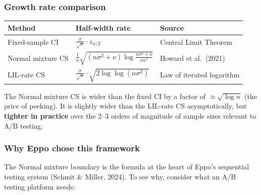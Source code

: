 \documentclass[12pt, a4paper]{article}
\begin{document}
\subsubsection*{Growth rate comparison}

\begin{center}
\begin{tabular}{@{} l l l @{}}
\toprule
\textbf{Method} & \textbf{Half-width rate} & \textbf{Source} \\
\midrule
Fixed-sample CI & $\displaystyle\frac{\sigma}{\sqrt{n}} \cdot z_{\alpha/2}$
  & Central Limit Theorem \\
Normal mixture CS & $\displaystyle\frac{1}{n}\sqrt{(n\sigma^2 + \nu)
  \log\frac{n\sigma^2 + \nu}{\nu\alpha^2}}$ & Howard et al.\ (2021) \\
LIL-rate CS & $\displaystyle\frac{\sigma}{\sqrt{n}} \cdot
  \sqrt{2\log\log(n\sigma^2)}$ & Law of iterated logarithm \\
\bottomrule
\end{tabular}
\end{center}

The Normal mixture CS is wider than the fixed CI by a factor of
$\approx\!\sqrt{\log n}$ (the price of peeking).  It is slightly wider than the
LIL-rate CS asymptotically, but \textbf{tighter in practice} over the 2--3
orders of magnitude of sample sizes relevant to A/B testing.

\subsubsection*{Why Eppo chose this framework}

The Normal mixture boundary is the formula at the heart of Eppo's sequential
testing system (Schmit \& Miller, 2024).  To see why, consider what an A/B
testing platform needs:
\end{document}
